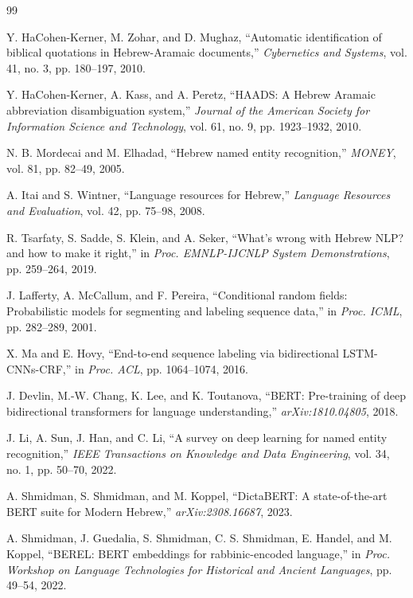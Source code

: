 \documentclass[conference,a4paper]{IEEEtran}
\begin{document}
\begin{thebibliography}{99}
\sloppy

Y. HaCohen-Kerner, M. Zohar, and D. Mughaz,
``Automatic identification of biblical quotations in Hebrew-Aramaic documents,''
\emph{Cybernetics and Systems}, vol. 41, no. 3, pp. 180--197, 2010.

Y. HaCohen-Kerner, A. Kass, and A. Peretz,
``HAADS: A Hebrew Aramaic abbreviation disambiguation system,''
\emph{Journal of the American Society for Information Science and Technology}, vol. 61, no. 9, pp. 1923--1932, 2010.

N. B. Mordecai and M. Elhadad,
``Hebrew named entity recognition,''
\emph{MONEY}, vol. 81, pp. 82--49, 2005.

A. Itai and S. Wintner,
``Language resources for Hebrew,''
\emph{Language Resources and Evaluation}, vol. 42, pp. 75--98, 2008.

R. Tsarfaty, S. Sadde, S. Klein, and A. Seker,
``What's wrong with Hebrew NLP? and how to make it right,''
in \emph{Proc. EMNLP-IJCNLP System Demonstrations}, pp. 259--264, 2019.

J. Lafferty, A. McCallum, and F. Pereira,
``Conditional random fields: Probabilistic models for segmenting and labeling sequence data,''
in \emph{Proc. ICML}, pp. 282--289, 2001.

X. Ma and E. Hovy,
``End-to-end sequence labeling via bidirectional LSTM-CNNs-CRF,''
in \emph{Proc. ACL}, pp. 1064--1074, 2016.

J. Devlin, M.-W. Chang, K. Lee, and K. Toutanova,
``BERT: Pre-training of deep bidirectional transformers for language understanding,''
\emph{arXiv:1810.04805}, 2018.

J. Li, A. Sun, J. Han, and C. Li,
``A survey on deep learning for named entity recognition,''
\emph{IEEE Transactions on Knowledge and Data Engineering}, vol. 34, no. 1, pp. 50--70, 2022.

A. Shmidman, S. Shmidman, and M. Koppel,
``DictaBERT: A state-of-the-art BERT suite for Modern Hebrew,''
\emph{arXiv:2308.16687}, 2023.

A. Shmidman, J. Guedalia, S. Shmidman, C. S. Shmidman, E. Handel, and M. Koppel,
``BEREL: BERT embeddings for rabbinic-encoded language,''
in \emph{Proc. Workshop on Language Technologies for Historical and Ancient Languages}, pp. 49--54, 2022.


\end{thebibliography}
\end{document}
